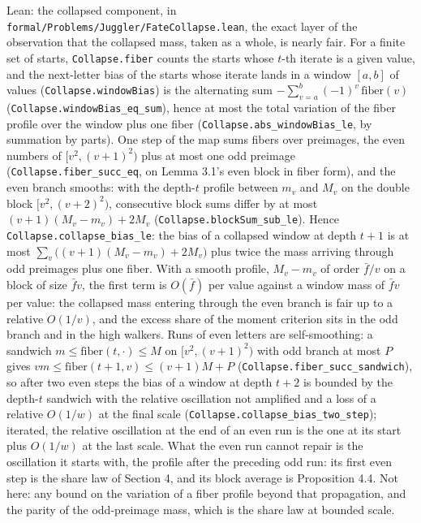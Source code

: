 \documentclass[11pt,a4paper]{article}
\begin{document}
Lean: the collapsed component, in
\texttt{\nolinkurl{formal/Problems/Juggler/FateCollapse.lean}}, the
exact layer of the observation that the collapsed mass, taken as a
whole, is nearly fair. For a finite set of starts,
\texttt{\nolinkurl{Collapse.fiber}} counts the starts whose \(t\)-th
iterate is a given value, and the next-letter bias of the starts whose
iterate lands in a window \([a,b]\) of values
(\texttt{\nolinkurl{Collapse.windowBias}}) is the alternating sum
\(-\sum_{v=a}^{b}(-1)^v\,\mathrm{fiber}(v)\)
(\texttt{\nolinkurl{Collapse.windowBias_eq_sum}}), hence at most the
total variation of the fiber profile over the window plus one fiber
(\texttt{\nolinkurl{Collapse.abs_windowBias_le}}, by summation by
parts). One step of the map sums fibers over preimages, the even numbers
of \([v^2,(v+1)^2)\) plus at most one odd preimage
(\texttt{\nolinkurl{Collapse.fiber_succ_eq}}, on Lemma 3.1's even block
in fiber form), and the even branch smooths: with the depth-\(t\)
profile between \(m_v\) and \(M_v\) on the double block
\([v^2,(v+2)^2)\), consecutive block sums differ by at most
\((v+1)(M_v-m_v)+2M_v\) (\texttt{\nolinkurl{Collapse.blockSum_sub_le}}).
Hence \texttt{\nolinkurl{Collapse.collapse_bias_le}}: the bias of a
collapsed window at depth \(t+1\) is at most
\(\sum_v\bigl((v+1)(M_v-m_v)+2M_v\bigr)\) plus twice the mass arriving
through odd preimages plus one fiber. With a smooth profile, \(M_v-m_v\)
of order \(\bar f/v\) on a block of size \(\bar fv\), the first term is
\(O(\bar f)\) per value against a window mass of \(\bar fv\) per value:
the collapsed mass entering through the even branch is fair up to a
relative \(O(1/v)\), and the excess share of the moment criterion sits
in the odd branch and in the high walkers. Runs of even letters are
self-smoothing: a sandwich \(m\le\mathrm{fiber}(t,\cdot)\le M\) on
\([v^2,(v+1)^2)\) with odd branch at most \(P\) gives
\(vm\le\mathrm{fiber}(t+1,v)\le(v+1)M+P\)
(\texttt{\nolinkurl{Collapse.fiber_succ_sandwich}}), so after two even
steps the bias of a window at depth \(t+2\) is bounded by the
depth-\(t\) sandwich with the relative oscillation not amplified and a
loss of a relative \(O(1/w)\) at the final scale
(\texttt{\nolinkurl{Collapse.collapse_bias_two_step}}); iterated, the
relative oscillation at the end of an even run is the one at its start
plus \(O(1/w)\) at the last scale. What the even run cannot repair is
the oscillation it starts with, the profile after the preceding odd run:
its first even step is the share law of Section 4, and its block average
is Proposition 4.4. Not here: any bound on the variation of a fiber
profile beyond that propagation, and the parity of the odd-preimage
mass, which is the share law at bounded scale.
\end{document}

